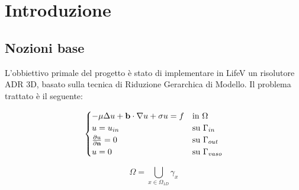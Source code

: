 \chapter{Introduzione}
\section{Nozioni base}

L'obbiettivo primale del progetto \`e stato di implementare in LifeV un risolutore ADR 3D, basato sulla tecnica di Riduzione Gerarchica di Modello.
Il problema trattato \`e il seguente:

\begin{equation}
\label{eq: problema forte}
\begin{cases}
-\mu\Delta u + \mathbf{b}\cdot \nabla u + \sigma u = f & \text{in $\Omega$}\\
u=u_{in} & \text{su $\Gamma_{in}$}\\
\frac{\partial u}{\partial \mathbf{n}}=0 & \text{su $\Gamma_{out}$ }\\
u=0 & \text{su $\Gamma _{vaso}$} \\
\end{cases}
\end{equation}


\begin{equation}
\label{eq:volume ridotto}
\Omega=\bigcup_{x\in \Omega_{1D}}\gamma_x
\end{equation}

\begin{center}
\end{center}


